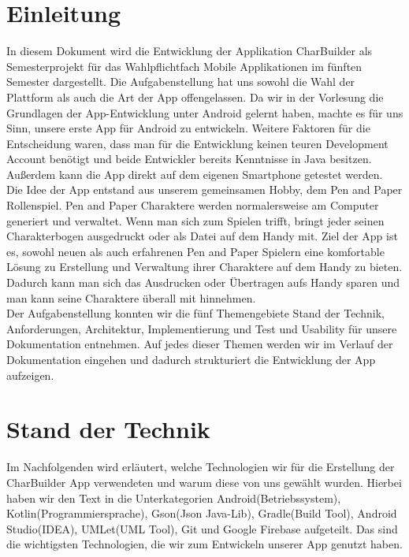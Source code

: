 \newpage
\section{Einleitung}
In diesem Dokument wird die Entwicklung der Applikation CharBuilder als Semesterprojekt für das Wahlpflichtfach Mobile Applikationen im fünften Semester dargestellt. Die Aufgabenstellung hat uns sowohl die Wahl der Plattform als auch die Art der App offengelassen. Da wir in der Vorlesung die Grundlagen der App-Entwicklung unter Android gelernt haben, machte es für uns Sinn, unsere erste App für Android zu entwickeln. Weitere Faktoren für die Entscheidung waren, dass man für die Entwicklung keinen teuren Development Account benötigt und beide Entwickler bereits Kenntnisse in Java besitzen. Außerdem kann die App direkt auf dem eigenen Smartphone getestet werden.\\

Die Idee der App entstand aus unserem gemeinsamen Hobby, dem Pen and Paper Rollenspiel. Pen and Paper Charaktere werden normalersweise am Computer generiert und verwaltet. Wenn man sich zum Spielen trifft, bringt jeder seinen Charakterbogen ausgedruckt oder als Datei auf dem Handy mit. Ziel der App ist es, sowohl neuen als auch erfahrenen Pen and Paper Spielern eine komfortable Lösung zu Erstellung und Verwaltung ihrer Charaktere auf dem Handy zu bieten. Dadurch kann man sich das Ausdrucken oder Übertragen aufs Handy sparen und man kann seine Charaktere überall mit hinnehmen.\\

Der Aufgabenstellung konnten wir die fünf Themengebiete Stand der Technik, Anforderungen, Architektur, Implementierung und Test und Usability für unsere Dokumentation entnehmen. Auf jedes dieser Themen werden wir im Verlauf der Dokumentation eingehen und dadurch strukturiert die Entwicklung der App aufzeigen.

\newpage
\section{Stand der Technik}
Im Nachfolgenden wird erläutert, welche Technologien wir für die Erstellung der CharBuilder App verwendeten und warum diese von uns gewählt wurden. Hierbei haben wir den Text in die Unterkategorien Android(Betriebssystem), Kotlin(Programmiersprache), Gson(Json Java-Lib), Gradle(Build Tool), Android Studio(IDEA), UMLet(UML Tool), Git und Google Firebase aufgeteilt. Das sind die wichtigsten Technologien, die wir zum Entwickeln unserer App genutzt haben.

